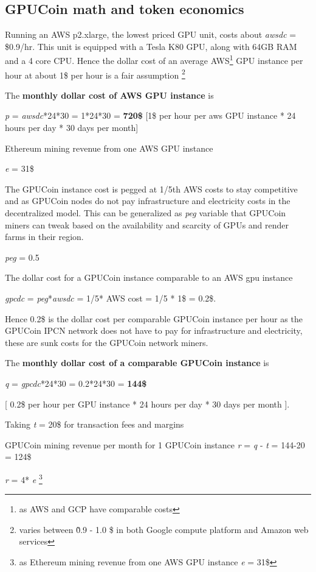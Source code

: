 \subsection{GPUCoin math and token economics}
Running an AWS p2.xlarge, the lowest priced GPU unit, costs about \emph{awsdc} = \$0.9/hr. This unit is equipped with a Tesla K80 GPU, along with 64GB RAM and a 4 core CPU. 
Hence the dollar cost of an average AWS\footnote{as AWS and GCP have comparable costs} GPU instance per hour at about 1\$ per hour is a fair assumption \footnote{ varies between \~ 0.9 - 1.0 \$ in both Google compute platform and Amazon web services}

The \textbf{monthly dollar cost of AWS GPU instance} is

\emph{p} = \emph{awsdc}*24*30 = 1*24*30 = \textbf{720\$  } [1\$ per hour per aws GPU instance * 24 hours per day * 30 days per month]

Ethereum mining revenue from one AWS GPU instance

\emph{e} = 31\$

The GPUCoin instance cost is pegged at 1/5th AWS costs to stay competitive and as GPUCoin nodes do not pay infrastructure and electricity costs in the decentralized model. This can be generalized as \emph{peg} variable that GPUCoin miners can tweak based on the availability and scarcity of GPUs and render farms in their region.

\emph{peg} = 0.5

The dollar cost for a GPUCoin instance comparable to an AWS gpu instance 

\emph{gpcdc} = \emph{peg}*\emph{awsdc} =  1/5* AWS cost = 1/5 * 1\$ = 0.2\$.

Hence 0.2\$ is the dollar cost per comparable GPUCoin instance per hour as the GPUCoin IPCN network does not have to pay for infrastructure and electricity, these are sunk costs for the GPUCoin network miners.

The \textbf{monthly dollar cost of a comparable GPUCoin instance} is 

\emph{q} = \emph{gpcdc}*24*30 = 0.2*24*30 = \textbf{144\$ }

[ 0.2\$ per hour per GPU instance * 24 hours per day * 30 days per month ].


Taking \emph{t} = 20\$ for transaction fees and margins

GPUCoin mining revenue per month for 1 GPUCoin instance
\emph{r} = \emph{q} - \emph{t} = 144-20 = 124\$

\emph{r} = 4* \emph{e} \footnote{as Ethereum mining revenue from one AWS GPU instance \emph{e} = 31\$}



